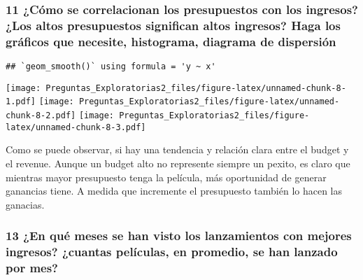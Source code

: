 \documentclass[
]{article}
\begin{document}
\subsubsection{11 ¿Cómo se correlacionan los presupuestos con los
ingresos? ¿Los altos presupuestos significan altos ingresos? Haga los
gráficos que necesite, histograma, diagrama de
dispersión}\label{cuxf3mo-se-correlacionan-los-presupuestos-con-los-ingresos-los-altos-presupuestos-significan-altos-ingresos-haga-los-gruxe1ficos-que-necesite-histograma-diagrama-de-dispersiuxf3n}

\begin{verbatim}
## `geom_smooth()` using formula = 'y ~ x'
\end{verbatim}

\texttt{[image: Preguntas\_Exploratorias2\_files/figure-latex/unnamed-chunk-8-1.pdf]}
\texttt{[image: Preguntas\_Exploratorias2\_files/figure-latex/unnamed-chunk-8-2.pdf]}
\texttt{[image: Preguntas\_Exploratorias2\_files/figure-latex/unnamed-chunk-8-3.pdf]}

Como se puede observar, si hay una tendencia y relación clara entre el
budget y el revenue. Aunque un budget alto no represente siempre un
pexito, es claro que mientras mayor presupuesto tenga la película, más
oportunidad de generar ganancias tiene. A medida que incremente el
presupuesto también lo hacen las ganacias.

\subsubsection{13 ¿En qué meses se han visto los lanzamientos con
mejores ingresos? ¿cuantas películas, en promedio, se han lanzado por
mes?}\label{en-quuxe9-meses-se-han-visto-los-lanzamientos-con-mejores-ingresos-cuantas-peluxedculas-en-promedio-se-han-lanzado-por-mes}
\end{document}
